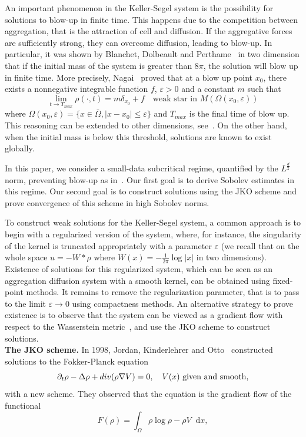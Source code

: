 \documentclass[a4paper,twosided, 11pt]{article}
\renewcommand{\color}[2][]{}
\newcommand{\eps}{\varepsilon}
\newcommand {\Div}  { {\rm div} }
\newcommand {\f}   {\frac}
\newcommand {\p}   {\partial}
\theoremstyle{plain}
\theoremstyle{remark}
\newcommand{\diff}{\mathop{}\!\mathrm{d}}
\numberwithin{equation}{section}
\begin{document}
An important phenomenon in the Keller-Segel system is the possibility for solutions to blow-up in finite time. This happens due to the competition between aggregation, that is the attraction of cell and diffusion. If the aggregative forces are sufficiently strong, they can overcome diffusion, leading to blow-up. In particular, it was shown by Blanchet, Dolbeault and Perthame~\cite{blanchet-keller-2006} in two dimension that if the initial mass of the system is greater than $8\pi$, the solution will blow up in finite time. More precisely, Nagai~\cite{NAGAI2001777} proved that at a blow up point $x_{0}$, there exists a nonnegative integrable function $f$, $\eps>0$ and a constant $m$ such that 
$$
\lim_{t\to T_{max}}\rho(\cdot , t) = m\delta_{x_{0}} + f \quad \text{weak star in $M(\Omega(x_{0},\eps))$}
$$
where $\Omega(x_{0},\eps)= \{x\in \bar{\Omega}, |x-x_0|\le \eps\}$ and $T_{max}$ is the final time of blow up. This reasoning can be extended to other dimensions, see~\cite{NAGAI19973837,perthame2006transport,Carrillo2018AggregationDiffusionED}.  On the other hand, when the initial mass is below this threshold, solutions are known to exist globally. 

In this paper, we {\color{blue} consider a small-data subcritical regime, quantified by the $L^{\f d2}$ norm, preventing blow-up as in~\cite{MR2099126}}. Our first goal is to derive Sobolev estimates in this regime. Our second goal is to construct solutions using the JKO scheme and prove convergence of this scheme in high Sobolev norms.

To construct weak solutions for the Keller-Segel system, a common approach is to begin with a regularized version of the system, where, for instance, the singularity of the kernel is truncated appropriately with a parameter $\eps$ (we recall that on the whole space $u=-W\ast \rho$ where $W(x) = -\f{1}{2\pi} \log |x|$ in two dimensions). Existence of solutions for this regularized system, which can be seen as an aggregation diffusion system with a smooth kernel, can be obtained using fixed-point methods. It remains to remove the regularization parameter, that is to pass to the limit $\eps \to 0$ using compactness methods. An alternative strategy to prove existence is to observe that the system can be viewed as a gradient flow with respect to the Wasserstein metric~\cite{blanchet2013gradient}, and use the JKO scheme to construct solutions.
 \\


\textbf{The JKO scheme.} In 1998, Jordan, Kinderlehrer and Otto~\cite{MR1617171} constructed solutions to the Fokker-Planck equation
$$
\p_t \rho - \Delta\rho + \Div(\rho\nabla V) = 0, \quad \text{$V(x)$ given and smooth,}
$$
with a new scheme. They observed that the equation is the gradient flow of the functional
$$
F(\rho) = \int_{\Omega}  \rho\log \rho - \rho V \diff x,
$$
\end{document}
